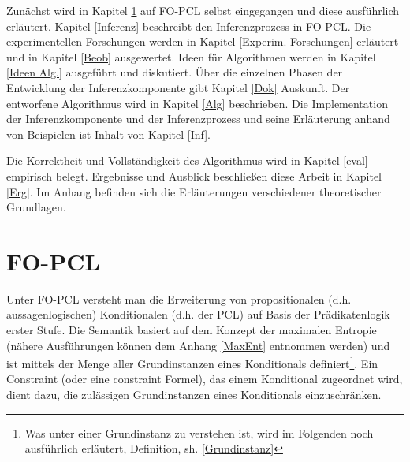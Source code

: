 \documentclass[a4paper, 11pt]{book}
\begin{document}
Zunächst wird in Kapitel \ref{FO-PCL} auf FO-PCL selbst eingegangen und diese ausführlich erläutert. Kapitel \ref{Inferenz} beschreibt den Inferenzprozess in FO-PCL. Die experimentellen Forschungen werden in Kapitel \ref{Experim. Forschungen} erläutert und in Kapitel \ref{Beob} ausgewertet. Ideen für Algorithmen werden in Kapitel \ref{Ideen Alg.} ausgeführt und diskutiert. Über die einzelnen Phasen der Entwicklung der Inferenzkomponente gibt Kapitel  \ref{Dok} Auskunft. Der entworfene Algorithmus wird in Kapitel \ref{Alg}  beschrieben. Die Implementation der Inferenzkomponente und der Inferenzprozess  und seine Erläuterung anhand von Beispielen ist Inhalt von Kapitel \ref{Inf}. 

 Die Korrektheit und Vollständigkeit des Algorithmus wird in Kapitel \ref{eval} empirisch belegt. Ergebnisse und Ausblick beschließen diese Arbeit in Kapitel \ref{Erg}. Im Anhang befinden sich die Erläuterungen verschiedener theoretischer Grundlagen.



\newpage

\chapter{FO-PCL}\label{FO-PCL} 
Unter FO-PCL versteht man die Erweiterung von propositionalen (d.h. aussagenlogischen) Konditionalen (d.h. der PCL) auf Basis der Prädikatenlogik erster Stufe. Die Semantik basiert auf dem Konzept der maximalen Entropie (nähere Ausführungen können dem Anhang \ref{MaxEnt} entnommen werden) und ist mittels der Menge aller Grundinstanzen eines Konditionals definiert\footnote{Was unter einer Grundinstanz zu verstehen ist, wird im Folgenden noch ausführlich erläutert, Definition, sh. \ref{Grundinstanz} }. Ein Constraint  (oder eine constraint Formel), das einem Konditional  zugeordnet wird, dient dazu,  die zulässigen Grundinstanzen eines Konditionals einzuschränken.
\end{document}
